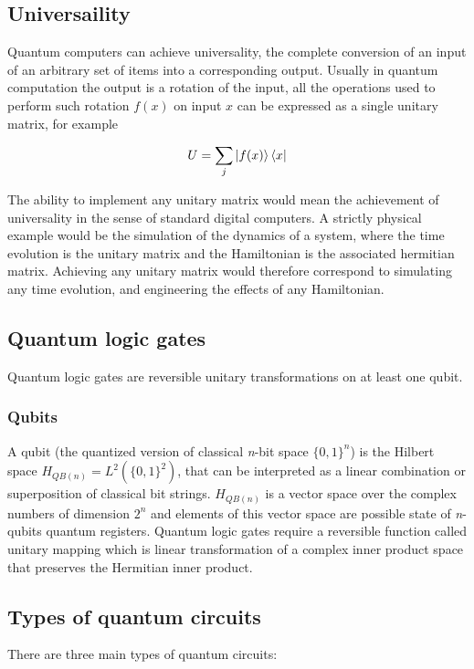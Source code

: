 	\subsection{Universaility}
	Quantum computers can achieve universality, the complete conversion of an input of an arbitrary set of items into a corresponding output.
	Usually in quantum computation the output is a rotation of the input, all the operations used to perform such rotation $f(x)$ on input $x$ can be expressed as a single unitary matrix, for example

	$$U=\sum_j\ket{f(x)}\bra{x}$$

	The ability to implement any unitary matrix would mean the achievement of universality in the sense of standard digital computers.
	A strictly physical example would be the simulation of the dynamics of a system, where the time evolution is the unitary matrix and the Hamiltonian is the associated hermitian matrix.
	Achieving any unitary matrix would therefore correspond to simulating any time evolution, and engineering the effects of any Hamiltonian.

	\subsection{Quantum logic gates}
	Quantum logic gates are reversible unitary transformations on at least one qubit.

		\subsubsection{Qubits}
A qubit (the quantized version of classical \textit{n}-bit space $\{0,1\}^n$) is the Hilbert space $H_{QB(n)}=L^2(\{0,1\}^2)$, that can be interpreted as a linear combination or superposition of classical bit strings.
$H_{QB(n)}$ is a vector space over the complex numbers of dimension $2^n$ and elements of this vector space are possible state of \textit{n}-qubits quantum registers.
Quantum logic gates require a reversible function called unitary mapping which is linear transformation of a complex inner product space that preserves the Hermitian inner product.

	\subsection{Types of quantum circuits}
	There are three main types of quantum circuits:

